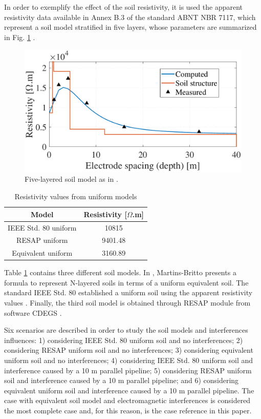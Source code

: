 \documentclass[conference]{IEEEtran}
\begin{document}
In order to exemplify the effect of the soil resistivity, it is used the apparent resistivity data available in Annex B.3 of the standard ABNT NBR 7117, which represent a soil model stratified in five layers, whose parameters are summarized in Fig. \ref{fig:SoilModel} \cite{NBR7117}.

\begin{figure}[hbt]
	\begin{center}
		\includegraphics[width=.8\columnwidth]{fig/soilmodel.pdf}
		\caption{Five-layered soil model as in \cite{NBR7117}.}
		\label{fig:SoilModel}
	\end{center}
\end{figure}

\begin{table}[!hbt]
	\renewcommand{\arraystretch}{1.3}
	\caption{Resistivity values from uniform models}
	\label{table:ResistivityValues}
	\centering
	\begin{tabular}{|c|c|}
		\hline
		\textbf{Model} & \textbf{Resistivity [$\Omega$.m]} \\
		\hline
		IEEE Std. 80 uniform & 10815\\
		\hline
		RESAP uniform & 9401.48\\
		\hline
		Equivalent uniform & 3160.89\\
		\hline
	\end{tabular}
\end{table}

Table \ref{table:ResistivityValues} contains three different soil models. In \cite{Martins-Britto2019}, Martins-Britto presents a formula to represent N-layered soils in terms of a uniform equivalent soil. The standard IEEE Std. 80 established a uniform soil using the apparent resistivity values \cite{IEEEStd80}. Finally, the third soil model is obtained through RESAP module from software CDEGS \cite{Dawalibi1984a}.

Six scenarios are described in order to study the soil models and interferences influences:  1) considering IEEE Std. 80 uniform soil and no interferences; 2) considering RESAP uniform soil and no interferences; 3) considering equivalent uniform soil and no interferences; 4) considering IEEE Std. 80 uniform soil and interference caused by a 10 m parallel pipeline; 5) considering RESAP uniform soil and interference caused by a 10 m parallel pipeline; and 6) considering equivalent uniform soil and interference caused by a 10 m parallel pipeline. The case with equivalent soil model and electromagnetic interferences is considered the most complete case and, for this reason, is the case reference in this paper.
\end{document}
